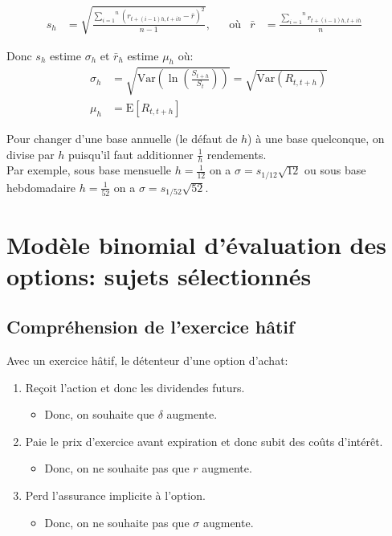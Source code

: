 \documentclass[10pt, french]{article}
\begin{document}
\begin{multicols*}{2}
\begin{align*}
	s_{h}
	&=	\sqrt{\frac{\overset{n}{\underset{i = 1}{\sum}} (r_{t + (i - 1)h, t + ih} - \bar{r})^{2}}{n - 1}}, &
	&\text{où}&
	\bar{r}
	&=	\frac{\overset{n}{\underset{i = 1}{\sum}} r_{t + (i - 1)h, t + ih}}{n}	&
\end{align*}

Donc $s_{h}$ estime $\sigma_{h}$ et $\bar{r}_{h}$ estime $\mu_{h}$ où:
	\begin{align*}
	\sigma_{h}
	&=	\sqrt{\text{Var}\left(\ln\left( \frac{S_{t + h}}{S_{t}} \right)\right)}	
	=	\sqrt{\text{Var}(R_{t, t + h})}	\\
	\mu_{h}
	&=	\text{E}[R_{t, t + h}]
	\end{align*}

Pour changer d'une base annuelle (le défaut de $h$) à une base quelconque, on divise par $h$ puisqu'il faut additionner $\frac{1}{h}$ rendements. \\
Par exemple, sous base mensuelle $h = \frac{1}{12}$ on a $\sigma = s_{1/12}\sqrt{12}$ ou sous base hebdomadaire $h = \frac{1}{52}$ on a $\sigma = s_{1/52}\sqrt{52}$.

\newpage

\section{Modèle binomial d’évaluation des options: sujets sélectionnés}

\subsection{Compréhension de l'exercice hâtif}

Avec un exercice hâtif, le détenteur d'une option {\color{amethyst}d'achat}:
\begin{enumerate}[leftmargin = *]
	\item	Reçoit l'action et donc les dividendes futurs.
		\begin{itemize}
		\item	Donc, on souhaite que $\delta$ \textcolor{amethyst}{augmente}.
		\end{itemize}
	\item	Paie le prix d'exercice avant expiration et donc subit des coûts d'intérêt.
		\begin{itemize}
		\item	Donc, on ne souhaite pas que $r$ \textcolor{amethyst}{augmente}.
		\end{itemize}
	\item	Perd l'assurance implicite à l'option.
		\begin{itemize}
		\item	Donc, on ne souhaite pas que $\sigma$ \textcolor{amethyst}{augmente}.
		\end{itemize}
\end{enumerate}


\end{multicols*}
\end{document}
